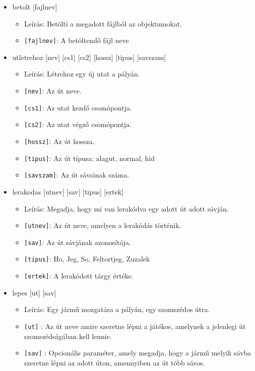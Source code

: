 \begin{itemize}
    \item betolt [fajlnev]
    \begin{itemize}
        \item Leírás: Betölti a megadott fájlból az objektumokat.
        \item \texttt{[fajlnev]}: A betöltendő fájl neve
    \end{itemize}

    \item utletrehoz [nev] [cs1] [cs2] [hossz] [tipus] [savszam]
    \begin{itemize}
        \item Leírás: Létrehoz egy új utat a pályán.
        \item \texttt{[nev]}: Az út neve.
        \item \texttt{[cs1]}: Az utat kezdő csomópontja.
        \item \texttt{[cs2]}: Az utat végző csomópontja.
        \item \texttt{[hossz]}: Az út hossza.
        \item \texttt{[tipus]}: Az út típusa: alagut, normal, hid
        \item \texttt{[savszam]}: Az út sávainak száma.
    \end{itemize}

    \item lerakodas [utnev] [sav] [tipus] [ertek]
    \begin{itemize}
        \item Leírás: Megadja, hogy mi van lerakódva egy adott út adott sávján. 
        \item \texttt{[utnev]}: Az út neve, amelyen a lerakódás történik.
        \item \texttt{[sav]}: Az út sávjának azonosítója.
        \item \texttt{[tipus]}: Ho, Jeg, So, Feltortjeg, Zuzalek
        \item \texttt{[ertek]}: A lerakódott tárgy értéke.
    \end{itemize}

    \item lepes [ut] [sav]
    \begin{itemize}
        \item Leírás: Egy jármű mozgatása a pályán, egy szomszédos útra. 
        \item \texttt{[ut]} : Az út neve amire szeretne lépni a játékos, amelynek a jelenlegi út szomszédságában kell lennie.
        \item \texttt{[sav]} : Opcionális paraméter, amely megadja, hogy a jármű melyik sávba szeretne lépni az adott úton, amennyiben az út több sávos.
    \end{itemize}


\end{itemize}
